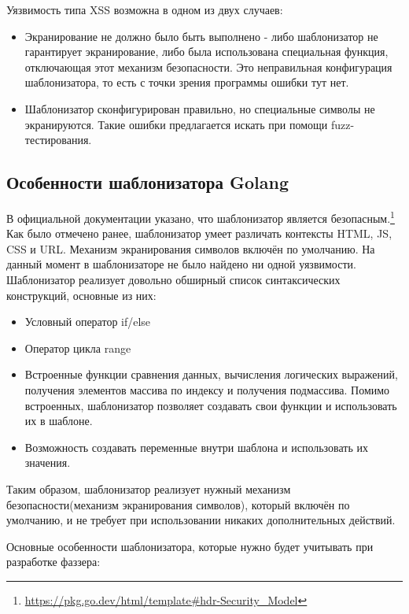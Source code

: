 \documentclass[a4paper]{article}
\begin{document}
Уязвимость типа XSS возможна в одном из двух случаев:

\begin{itemize}
    \item Экранирование не должно было быть выполнено - либо шаблонизатор не гарантирует экранирование, либо была использована специальная функция, отключающая этот механизм безопасности. Это неправильная конфигурация шаблонизатора, то есть с точки зрения программы ошибки тут нет.
    \item Шаблонизатор сконфигурирован правильно, но специальные символы не экранируются. Такие ошибки предлагается искать при помощи fuzz-тестирования.
\end{itemize}

\subsection{Особенности шаблонизатора Golang}
В официальной документации указано, что шаблонизатор является безопасным.\footnote{\href{https://pkg.go.dev/html/template\#hdr-Security\_Model}{https://pkg.go.dev/html/template\#hdr-Security\_Model}} Как было отмечено ранее, шаблонизатор умеет различать контексты HTML, JS, CSS и URL. Механизм экранирования символов включён по умолчанию. На данный момент в шаблонизаторе не было найдено ни одной уязвимости. Шаблонизатор реализует довольно обширный список синтаксических конструкций, основные из них: 
\begin{itemize}
    \item Условный оператор if/else
    \item Оператор цикла range
    \item Встроенные функции сравнения данных, вычисления логических выражений, получения элементов массива по индексу и получения подмассива. Помимо встроенных, шаблонизатор позволяет создавать свои функции и использовать их в шаблоне.
    \item Возможность создавать переменные внутри шаблона и использовать их значения.
\end{itemize}
Таким образом, шаблонизатор реализует нужный механизм безопасности(механизм экранирования символов), который включён по умолчанию, и не требует при использовании никаких дополнительных действий.

Основные особенности шаблонизатора, которые нужно будет учитывать при разработке фаззера:
\end{document}
